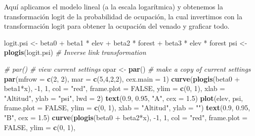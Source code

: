 \documentclass[]{book}
\newenvironment{Shaded}{\begin{snugshade}}{\end{snugshade}}
\newcommand{\KeywordTok}[1]{\textcolor[rgb]{0.13,0.29,0.53}{\textbf{{#1}}}}
\newcommand{\DataTypeTok}[1]{\textcolor[rgb]{0.13,0.29,0.53}{{#1}}}
\newcommand{\DecValTok}[1]{\textcolor[rgb]{0.00,0.00,0.81}{{#1}}}
\newcommand{\FloatTok}[1]{\textcolor[rgb]{0.00,0.00,0.81}{{#1}}}
\newcommand{\StringTok}[1]{\textcolor[rgb]{0.31,0.60,0.02}{{#1}}}
\newcommand{\CommentTok}[1]{\textcolor[rgb]{0.56,0.35,0.01}{\textit{{#1}}}}
\newcommand{\OtherTok}[1]{\textcolor[rgb]{0.56,0.35,0.01}{{#1}}}
\newcommand{\NormalTok}[1]{{#1}}
\begin{document}
Aquí aplicamos el modelo lineal (a la escala logarítmica) y obtenemos la
transformación logit de la probabilidad de ocupación, la cual invertimos
con la transformación logit para obtener la ocupación del venado y
graficar todo.

\begin{Shaded}
\begin{Highlighting}[]
\NormalTok{logit.psi <-}\StringTok{ }\NormalTok{beta0 +}\StringTok{ }\NormalTok{beta1 *}\StringTok{ }\NormalTok{elev +}\StringTok{ }\NormalTok{beta2 *}\StringTok{ }\NormalTok{forest +}\StringTok{ }\NormalTok{beta3 *}\StringTok{ }\NormalTok{elev *}\StringTok{ }\NormalTok{forest}
\NormalTok{psi <-}\StringTok{ }\KeywordTok{plogis}\NormalTok{(logit.psi)      }\CommentTok{# Inverse link transformation}

\CommentTok{# par()              # view current settings}
\NormalTok{opar <-}\StringTok{ }\KeywordTok{par}\NormalTok{()      }\CommentTok{# make a copy of current settings}
\KeywordTok{par}\NormalTok{(}\DataTypeTok{mfrow =} \KeywordTok{c}\NormalTok{(}\DecValTok{2}\NormalTok{, }\DecValTok{2}\NormalTok{), }\DataTypeTok{mar =} \KeywordTok{c}\NormalTok{(}\DecValTok{5}\NormalTok{,}\DecValTok{4}\NormalTok{,}\DecValTok{2}\NormalTok{,}\DecValTok{2}\NormalTok{), }\DataTypeTok{cex.main =} \DecValTok{1}\NormalTok{)}
\KeywordTok{curve}\NormalTok{(}\KeywordTok{plogis}\NormalTok{(beta0 +}\StringTok{ }\NormalTok{beta1*x), -}\DecValTok{1}\NormalTok{, }\DecValTok{1}\NormalTok{, }\DataTypeTok{col =} \StringTok{"red"}\NormalTok{, }\DataTypeTok{frame.plot =} \OtherTok{FALSE}\NormalTok{, }\DataTypeTok{ylim =} \KeywordTok{c}\NormalTok{(}\DecValTok{0}\NormalTok{, }\DecValTok{1}\NormalTok{),}
      \DataTypeTok{xlab =} \StringTok{"Altitud"}\NormalTok{, }\DataTypeTok{ylab =} \StringTok{"psi"}\NormalTok{, }\DataTypeTok{lwd =} \DecValTok{2}\NormalTok{)}
\KeywordTok{text}\NormalTok{(}\FloatTok{0.9}\NormalTok{, }\FloatTok{0.95}\NormalTok{, }\StringTok{"A"}\NormalTok{, }\DataTypeTok{cex =} \FloatTok{1.5}\NormalTok{)}
\KeywordTok{plot}\NormalTok{(elev, psi, }\DataTypeTok{frame.plot =} \OtherTok{FALSE}\NormalTok{, }\DataTypeTok{ylim =} \KeywordTok{c}\NormalTok{(}\DecValTok{0}\NormalTok{, }\DecValTok{1}\NormalTok{), }\DataTypeTok{xlab =} \StringTok{"Altitud"}\NormalTok{, }\DataTypeTok{ylab =} \StringTok{""}\NormalTok{)}
\KeywordTok{text}\NormalTok{(}\FloatTok{0.9}\NormalTok{, }\FloatTok{0.95}\NormalTok{, }\StringTok{"B"}\NormalTok{, }\DataTypeTok{cex =} \FloatTok{1.5}\NormalTok{)}
\KeywordTok{curve}\NormalTok{(}\KeywordTok{plogis}\NormalTok{(beta0 +}\StringTok{ }\NormalTok{beta2*x), -}\DecValTok{1}\NormalTok{, }\DecValTok{1}\NormalTok{, }\DataTypeTok{col =} \StringTok{"red"}\NormalTok{, }\DataTypeTok{frame.plot =} \OtherTok{FALSE}\NormalTok{, }\DataTypeTok{ylim =} \KeywordTok{c}\NormalTok{(}\DecValTok{0}\NormalTok{, }\DecValTok{1}\NormalTok{), }

\end{Highlighting}
\end{Shaded}
\end{document}
